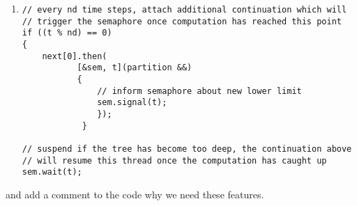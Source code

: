 \documentclass[11pt]{article}
\begin{document}
\begin{enumerate}
\begin{enumerate}
\item \begin{lstlisting}
// every nd time steps, attach additional continuation which will
// trigger the semaphore once computation has reached this point
if ((t % nd) == 0)
{
    next[0].then(
           [&sem, t](partition &&)
           {
               // inform semaphore about new lower limit
               sem.signal(t);
               });
            }

// suspend if the tree has become too deep, the continuation above
// will resume this thread once the computation has caught up
sem.wait(t);
\end{lstlisting}
\end{enumerate}

\end{enumerate}
and add a comment to the code why we need these features.

\doclicenseThis 
\end{document}
